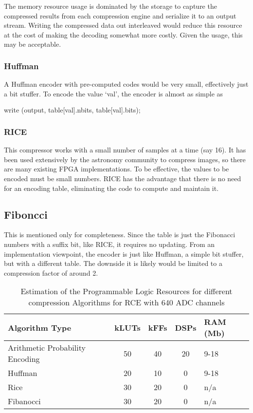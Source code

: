 The memory resource usage is dominated by the storage to capture the compressed results from each compression engine and serialize it to an output stream. Writing the compressed data out interleaved would reduce this resource at the cost of making the decoding somewhat more costly.  Given the usage, this may be acceptable.

\subsubsection{Huffman}
A Huffman encoder with pre-computed codes would be very small, effectively just a bit stuffer.  To encode the value ‘val’, the encoder is almost as simple as

  \begin{center} 
    write (output, table[val].nbits, table[val].bits);   
   \end{center}
   
\subsubsection{RICE}
This compressor works with a small number of samples at a time (say 16). It has been used extensively by the astronomy community to compress images, so there are many existing FPGA implementations. To be effective, the values to be encoded must be small numbers. 
RICE has the advantage that there is no need for an encoding table, eliminating the code to compute and maintain it.


\subsection{Fiboncci}
This is mentioned only for completeness. Since the table is just the Fibonacci numbers with a suffix bit, like RICE, it requires no updating.  From an implementation viewpoint, the encoder is just like Huffman, a simple bit stuffer, but with a different table. The downside it is likely would be limited to a compression factor of around 2.



\begin{table}[tb]
\centering
\begin{tabular}{|l|c|c|c|l|}
\hline
Algorithm Type                  & kLUTs & kFFs  & DSPs & RAM (Mb) \\ \hline
Arithmetic Probability Encoding & 50   & 40   & 20   & 9-18     \\ \hline
Huffman                         & 20   & 10   &  0   & 9-18     \\ \hline
Rice                            & 30   & 20   &  0   & n/a      \\ \hline
Fibanocci                       & 30   & 20   &  0   & n/a      \\ \hline
\end{tabular}
\caption{ Estimation of the Programmable Logic Resources for different compression Algorithms for RCE with 640 ADC channels}
\label{tab:DataCompression}
\end{table}

